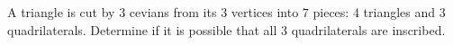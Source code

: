 A triangle is cut by $3$ cevians from its $3$ vertices into $7$ pieces: $4$ triangles and $3$ quadrilaterals. Determine if it is possible that all $3$ quadrilaterals are inscribed.